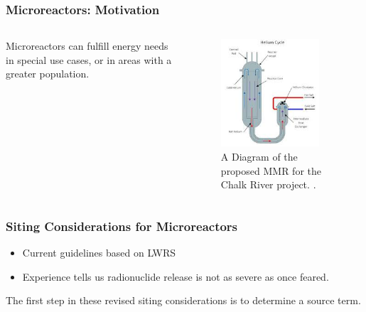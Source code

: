 \begin{frame}
\frametitle{Microreactors: Motivation}
\begin{columns}
  \column[t]{5cm}
  Microreactors can fulfill energy needs in special use cases, or in
  areas with a greater population.
  \column[t]{5cm}
    \begin{figure}[htbp!]
    \begin{center}
    \includegraphics[height=4cm]{./images/mmr-chalk-river}
    \end{center}
    \caption{A Diagram of the proposed MMR for the Chalk River project. \cite{mmr-chalk-river}.}
    \label{fig:kittenfigure}
    \end{figure}

\end{columns}
\end{frame}


\begin{frame}
\frametitle{Siting Considerations for Microreactors}

  \begin{itemize}
    \item Current guidelines based on LWRS
    \item Experience tells us radionuclide release is not as severe as once feared.
  \end{itemize}

  The first step in these revised siting considerations is to determine a source term.

\end{frame}
